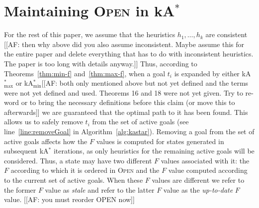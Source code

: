 \documentclass[twoside,11pt]{article}
\newtheorem{definition}[theorem]{Definition}
\newcommand{\kastar}{kA$^*$\xspace}
\newcommand{\kastarvar}[1]{\textup{kA}$^*_{#1}$\xspace}
\newcommand{\kastarmin}{\kastarvar{\min}}
\newcommand{\kastarmax}{\kastarvar{\max}}
\newcommand{\open}{\textsc{Open}\xspace}
\begin{document}
\section{Maintaining \open in \kastar} \label{sec:lazy}

For the rest of this paper, we assume that the heuristics $h_1,\ldots, h_k$ are consistent [[AF: then why above did you also assume inconsistent. Maybe assume this for the entire paper and delete everything that has to do with inconsistent heuristics. The paper is too long with details anyway.]]
Thus, according to Theorems~\ref{thm:min-f} and~\ref{thm:max-f}, when a goal $t_i$ is expanded by either \kastarmax or \kastarmin [[AF: both only mentioned above but not yet defined and the terms were not yet defined and used. Theorems 16 and 18 were not yet given. Try to re-word or to bring the necessary definitions before this claim (or move this to afterwards]] we are guaranteed that the optimal path to it has been found.
This allows us to safely remove $t_i$ from the set of active goals (see line~\ref{line:removeGoal} in Algorithm~\ref{alg:kastar}).
Removing a goal from the set of active goals affects how the $F$ values is computed for states generated in subsequent \kastar iterations, as only heuristics for the remaining active goals will be considered.
Thus, a state may have two different $F$ values associated with it: the $F$ according to which it is ordered in \open and the $F$ value computed according to the current set of active goals.
When these $F$ values are different we refer to the former $F$ value as \emph{stale} and refer to the latter $F$ value as the \emph{up-to-date} $F$ value. [[AF: you must reorder OPEN now]]


\end{document}
